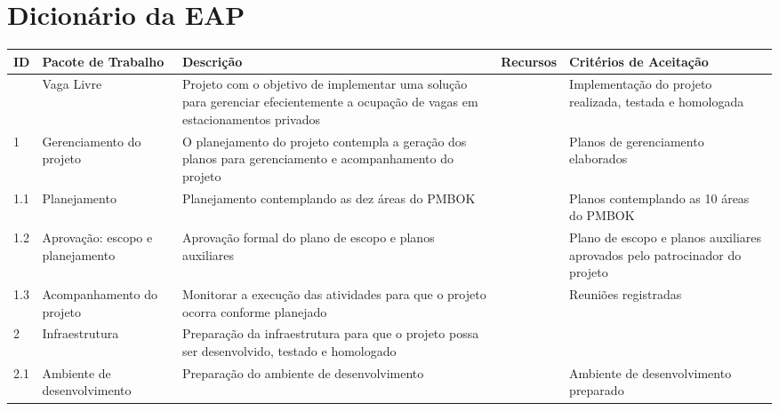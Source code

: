 
\chapter{Dicionário da EAP}
\label{ch:wbs-dictionary}

	\begin{longtable}{ l  p{}  p{}  l  p{}  }
		\toprule
		\textbf{ID} & \textbf{Pacote de Trabalho}                               & \textbf{Descrição} & \textbf{Recursos} & \textbf{Critérios de Aceitação} \\
		\midrule
		            & Vaga Livre                                                & Projeto com o objetivo de implementar uma solução para gerenciar efecientemente a ocupação de vagas em estacionamentos privados &                   & Implementação do projeto realizada, testada e homologada \\*
		\midrule
		1           & Gerenciamento do projeto                                  & O planejamento do projeto contempla a geração dos planos para gerenciamento e acompanhamento do projeto  &                   & Planos de gerenciamento elaborados \\*
		\midrule
		1.1         & Planejamento                                              & Planejamento contemplando as dez áreas do PMBOK &                   & Planos contemplando as 10 áreas do PMBOK \\*
		\midrule
		1.2         & Aprovação: escopo e planejamento                        & Aprovação formal do plano de escopo e planos auxiliares &                   & Plano de escopo e planos auxiliares aprovados pelo patrocinador do projeto \\*
		\midrule
		1.3         & Acompanhamento do projeto                                 & Monitorar a execução das atividades para que o projeto ocorra conforme planejado & & Reuniões registradas \\*
		\midrule
		2           & Infraestrutura                                            & Preparação da infraestrutura para que o projeto possa ser desenvolvido, testado e homologado & & \\*
		\midrule
		2.1         & Ambiente de desenvolvimento                               & Preparação do ambiente de desenvolvimento &                   & Ambiente de desenvolvimento preparado \\*

\end{longtable}
